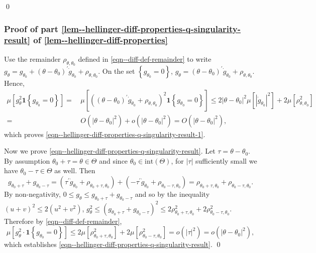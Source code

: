\documentclass[12pt]{article}
\let\Cref\autoref
\theoremstyle{definition}
\theoremstyle{plain}
\begin{document}
\qed

\subsubsection{Proof of part
\ref{lem--hellinger-diff-properties-q-singularity-result} of
\Cref{lem--hellinger-diff-properties}}

Use the remainder \(\rho_{\theta, \theta_{0}}\) defined in
\eqref{eqn--diff-def-remainder} to write \(g_{\theta} = g_{\theta_{0}} + (\theta
- \theta_{0})^{\prime} \dot{g}_{\theta_{0}} + \rho_{\theta, \theta_{0}}\).
On the set \(\left\{ g_{\theta_{0}} = 0 \right\}\),
\(g_{\theta} = (\theta - \theta_{0})^{\prime} \dot{g}_{\theta_{0}} +
\rho_{\theta, \theta_{0}}\).
Hence,
\begin{equation*}
  \begin{split}
    \mu \left[ g_{\theta}^{2} \mathbf{1} \left\{ g_{\theta_{0}} = 0 \right\}
    \right] =
    & \, \mu \left[ \left( (\theta - \theta_{0})^{\prime} \dot{g}_{\theta_{0}} +
    \rho_{\theta, \theta_{0}} \right)^{2} \mathbf{1} \left\{ g_{\theta_{0}} = 0
    \right\} \right]
    \leq
    2 |\theta - \theta_{0}|^{2} \mu \left[ \left|
    \dot{g}_{\theta_{0}} \right|^{2} \right] + 2 \mu \left[ \rho_{\theta,
    \theta_{0}}^{2} \right] \\
    =
    & \, O \left( |\theta - \theta_{0}|^{2} \right) + o \left( |\theta -
    \theta_{0}|^{2} \right) = O \left( |\theta - \theta_{0}|^{2} \right),
  \end{split}
\end{equation*}
which proves \eqref{eqn--hellinger-diff-properties-q-singularity-result-1}.

Now we prove \eqref{eqn--hellinger-diff-properties-q-singularity-result}.
Let \(\tau = \theta - \theta_{0}\).
By assumption \(\theta_{0} + \tau = \theta \in \Theta\) and since \(\theta_{0}
\in \mathrm{int} (\Theta)\), for \(|\tau|\) sufficiently small we have
\(\theta_{0} - \tau \in \Theta\) as well.
Then
\begin{equation*}
  g_{\theta_{0} + \tau} + g_{\theta_{0} - \tau} = \left( \tau^{\prime}
  \dot{g}_{\theta_{0}} + \rho_{\theta_{0} + \tau, \theta_{0}} \right) + \left( -
  \tau^{\prime} \dot{g}_{\theta_{0}} + \rho_{\theta_{0} - \tau, \theta_{0}}
  \right) = \rho_{\theta_{0} + \tau, \theta_{0}} + \rho_{\theta_{0} - \tau,
  \theta_{0}}.
\end{equation*}
By non-negativity, \(0 \leq g_{\theta} \leq g_{\theta_{0} + \tau} +
g_{\theta_{0} - \tau}\) and so by the inequality \((u + v)^{2} \leq 2 \left(
u^{2} + v^{2} \right)\), \(g_{\theta}^{2} \leq \left( g_{\theta_{0} + \tau} +
g_{\theta_{0} - \tau} \right)^{2} \leq 2 \rho_{\theta_{0} + \tau,
\theta_{0}}^{2} + 2 \rho_{\theta_{0} - \tau, \theta_{0}}^{2}\).
Therefore by \eqref{eqn--diff-def-remainder},
\begin{equation*}
  \mu \left[ g_{\theta}^{2} \cdot \mathbf{1} \left\{ g_{\theta_{0}} = 0 \right\}
  \right] \leq 2 \mu \left[ \rho_{\theta_{0} + \tau, \theta_{0}}^{2} \right] + 2
  \mu \left[ \rho_{\theta_{0} - \tau, \theta_{0}}^{2} \right] = o \left(
  |\tau|^{2} \right) = o \left( |\theta - \theta_{0}|^{2} \right),
\end{equation*}
which establishes \eqref{eqn--hellinger-diff-properties-q-singularity-result}.
\qed
\end{document}
